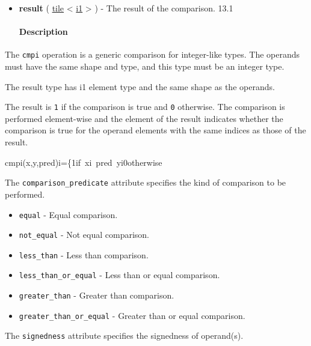 \documentclass{article}
\begin{document}
\begin{itemize}
\paragraph{Results}

\item \textbf{result} ( \href{https://docs.nvidia.com/cuda/tile-ir/latest/sections/types.html#type-tile}{tile} < \href{https://docs.nvidia.com/cuda/tile-ir/latest/sections/types.html#subsection-element-types}{i1} > ) - The result of the comparison. 13.1


\paragraph{Description}

\end{itemize}
The \texttt{cmpi} operation is a generic comparison for integer-like types. The operands must have the same shape and type, and this type must be an integer type.

The result type has i1 element type and the same shape as the operands.


The result is \texttt{1} if the comparison is true and \texttt{0} otherwise. The comparison is performed element-wise and the element of the result indicates whether the comparison is true for the operand elements with the same indices as those of the result.


cmpi(x,y,pred)i=\{1if xi pred yi0otherwise

The \texttt{comparison\_predicate} attribute specifies the kind of comparison to be performed.


\begin{itemize}
\item \texttt{equal} - Equal comparison.
\item \texttt{not\_equal} - Not equal comparison.
\item \texttt{less\_than} - Less than comparison.
\item \texttt{less\_than\_or\_equal} - Less than or equal comparison.
\item \texttt{greater\_than} - Greater than comparison.
\item \texttt{greater\_than\_or\_equal} - Greater than or equal comparison.

\end{itemize}
The \texttt{signedness} attribute specifies the signedness of operand(s).
\end{document}
